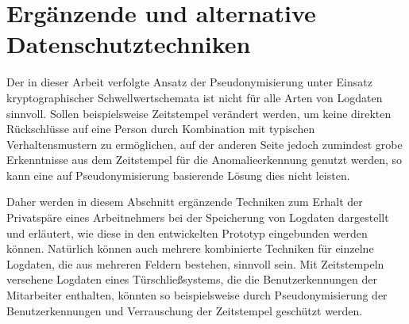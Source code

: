 \chapter{Ergänzende und alternative Datenschutztechniken}

\label{cha_alternatives}


%

%



Der in dieser Arbeit verfolgte Ansatz der Pseudonymisierung unter Einsatz kryptographischer Schwellwertschemata ist nicht für alle Arten von Logdaten sinnvoll. Sollen beispielsweise Zeitstempel verändert werden, um keine direkten Rückschlüsse auf eine Person durch Kombination mit typischen Verhaltensmustern zu ermöglichen, auf der anderen Seite jedoch zumindest grobe Erkenntnisse aus dem Zeitstempel für die Anomalieerkennung genutzt werden, so kann eine auf Pseudonymisierung basierende Lösung dies nicht leisten. 

Daher werden in diesem Abschnitt ergänzende Techniken zum Erhalt der Privatspäre eines Arbeitnehmers bei der Speicherung von Logdaten dargestellt und erläutert, wie diese in den entwickelten Prototyp eingebunden werden können. Natürlich können auch mehrere kombinierte Techniken für einzelne Logdaten, die aus mehreren Feldern bestehen, sinnvoll sein. Mit Zeitstempeln versehene Logdaten eines Türschließsystems, die die Benutzerkennungen der Mitarbeiter enthalten, könnten so beispielsweise durch Pseudonymisierung der Benutzerkennungen und Verrauschung der Zeitstempel geschützt werden.

